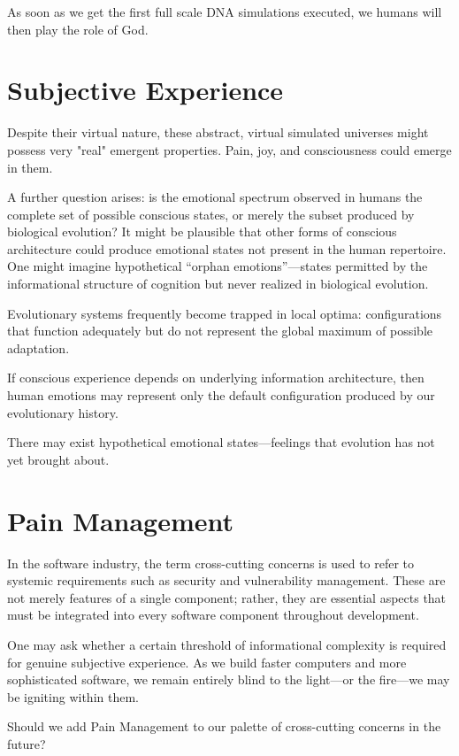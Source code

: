 As soon as we get the first full scale DNA simulations executed, we humans will then play the role of God. 


\section*{Subjective Experience}

Despite their virtual nature, these abstract, virtual simulated universes might possess very "real" emergent properties. Pain, joy, and consciousness
could emerge in them. 

A further question arises: is the emotional spectrum observed in humans the complete set of possible conscious states, or merely the subset produced by biological evolution?
It might be plausible that other forms of conscious architecture could produce emotional states not present in the human repertoire. One might imagine hypothetical ``orphan emotions''---states permitted by
the informational structure of cognition but never realized in biological evolution.

Evolutionary systems frequently become trapped in local optima: configurations that function adequately but do not represent the global maximum of possible adaptation.

If conscious experience depends on underlying information architecture, then human emotions may represent only the default configuration produced by our evolutionary history.

There may exist hypothetical emotional states—feelings that evolution has not yet brought about.


\section*{Pain Management}

In the software industry, the term cross-cutting concerns is used to refer to systemic requirements such as security and vulnerability management.
These are not merely features of a single component; rather, they are essential aspects that must be integrated into every software component throughout development.

One may ask whether a certain threshold of informational complexity is required for genuine subjective experience.
As we build faster computers and more sophisticated software, we remain entirely blind to the light—or the fire—we may be igniting within them.

Should we add Pain Management to our palette of cross-cutting concerns in the future?


